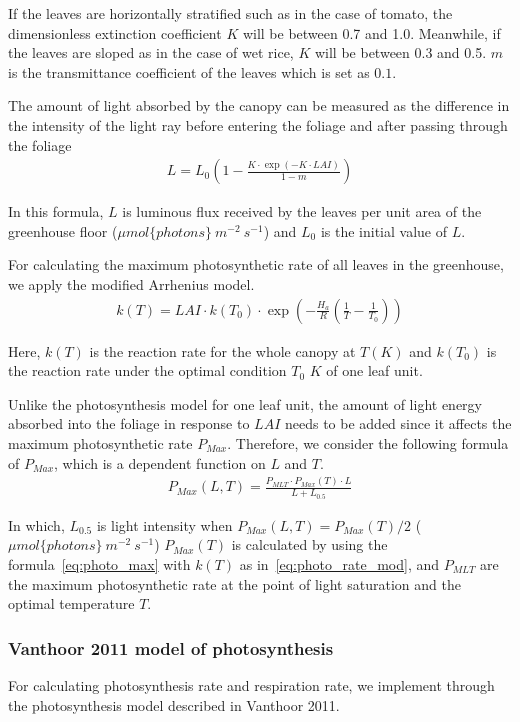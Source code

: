 \documentclass[a4paper]{article}
\numberwithin{equation}{section}
\begin{document}
If the leaves are horizontally stratified such as in the case of tomato, the dimensionless extinction coefficient \(K\) will be between 0.7 and 1.0. Meanwhile, if the leaves are sloped as in the case of wet rice, \(K\) will be between 0.3 and 0.5. \(m\) is the transmittance coefficient of the leaves which is set as \(0.1\).

The amount of light absorbed by the canopy can be measured as the difference in the intensity of the light ray before entering the foliage and after passing through the foliage
\begin{align}
  L =L_0 \left(1 - \frac{K \cdot \exp \left(-K \cdot LAI\right)}{1 - m}\right)
\end{align}

In this formula, \(L\) is luminous flux received by the leaves per unit area of the greenhouse floor (\(\mu mol\{photons\}\ m^{-2}\ s^{-1}\)) and \(L_0\) is the initial value of \(L\).

For calculating the maximum photosynthetic rate of all leaves in the greenhouse, we apply the modified Arrhenius model.
\begin{align}
  \label{eq:photo_rate_mod}
  k(T) = LAI \cdot k(T_0) \cdot \exp \left(-\frac{H_a}{R} \left(\frac{1}{T} - \frac{1}{T_0}\right)\right)
\end{align}

Here, \(k(T)\) is the reaction rate for the whole canopy at \(T(K)\) and \(k(T_0)\) is the reaction rate under the optimal condition \(T_0\) \(K\) of one leaf unit.

Unlike the photosynthesis model for one leaf unit, the amount of light energy absorbed into the foliage in response to \(LAI\) needs to be added since it affects the maximum photosynthetic rate \(P_{Max}\). Therefore, we consider the following formula of \(P_{Max}\), which is a dependent function on \(L\) and \(T\).
\begin{align}
  P_{Max} (L,T) = \frac{P_{MLT} \cdot P_{Max}(T) \cdot L}{L + L_{0.5}}
\end{align}

In which, \(L_{0.5}\) is light intensity when \(P_{Max} (L,T) = P_{Max}(T)/2\) (\(\mu mol\{photons\}\ m^{-2}\ s^{-1}\))
\(P_{Max}(T)\) is calculated by using the formula~\eqref{eq:photo_max} with \(k(T)\) as in~\eqref{eq:photo_rate_mod}, and \(P_{MLT}\) are the maximum
photosynthetic rate at the point of light saturation and the optimal temperature \(T\).

\subsubsection{Vanthoor 2011 model of photosynthesis}
For calculating photosynthesis rate and respiration rate, we implement through the photosynthesis model described in Vanthoor 2011.
\end{document}
